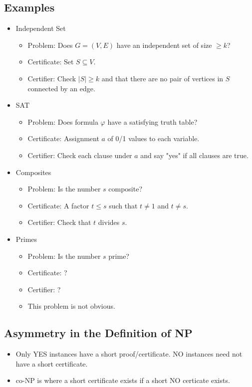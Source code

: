 \subsection{Examples}
\begin{itemize}
    \item Independent Set
    \begin{itemize}
        \item Problem: Does $G = (V, E)$ have an independent set of size $\geq k$?
        \item Certificate: Set $S \subseteq V$.
        \item Certifier: Check $\left| S \right| \geq k$ and that there are no pair of vertices in $S$ connected by an edge.
    \end{itemize}
    \item SAT
    \begin{itemize}
        \item Problem: Does formula $\varphi$ have a satisfying truth table?
        \item Certificate: Assignment $a$ of 0/1 values to each variable.
        \item Certifier: Check each clause under $a$ and say "yes" if all clauses are true.
    \end{itemize}
    \item Composites
    \begin{itemize}
        \item Problem: Is the number $s$ composite?
        \item Certificate: A factor $t \leq s$ such that $t \neq 1$ and $t \neq s$.
        \item Certifier: Check that $t$ divides $s$.
    \end{itemize}
    \item Primes
    \begin{itemize}
        \item Problem: Is the number $s$ prime?
        \item Certificate: ?
        \item Certifier: ?
        \item This problem is not obvious.
    \end{itemize}
\end{itemize}

\subsection{Asymmetry in the Definition of NP}
\begin{itemize}
    \item Only YES instances have a short proof/certificate. NO instances need not have a short certificate.
    \item co-NP is where a short certificate exists if a short NO certicate exists.
\end{itemize}

